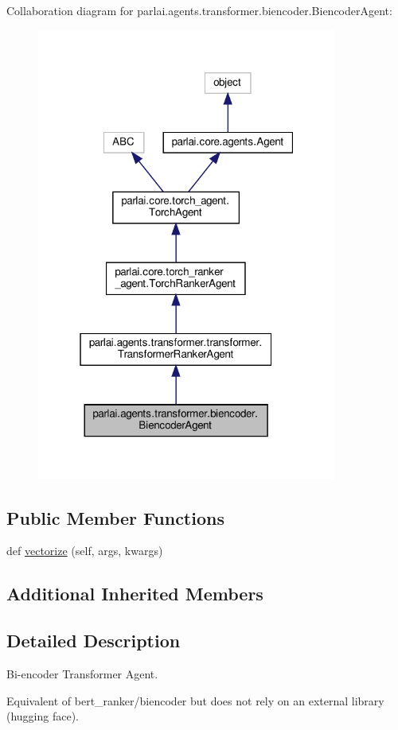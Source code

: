 Collaboration diagram for parlai.\+agents.\+transformer.\+biencoder.\+Biencoder\+Agent\+:
\nopagebreak
\begin{figure}[H]
\begin{center}
\leavevmode
\includegraphics[width=280pt]{d8/da9/classparlai_1_1agents_1_1transformer_1_1biencoder_1_1BiencoderAgent__coll__graph}
\end{center}
\end{figure}
\subsection*{Public Member Functions}
\begin{DoxyCompactItemize}
\item 
def \hyperlink{classparlai_1_1agents_1_1transformer_1_1biencoder_1_1BiencoderAgent_a0a75b68e9e6877358245f85bcb438d03}{vectorize} (self, args, kwargs)
\end{DoxyCompactItemize}
\subsection*{Additional Inherited Members}


\subsection{Detailed Description}
\begin{DoxyVerb}Bi-encoder Transformer Agent.

Equivalent of bert_ranker/biencoder but does not rely on an external library
(hugging face).
\end{DoxyVerb}
 


